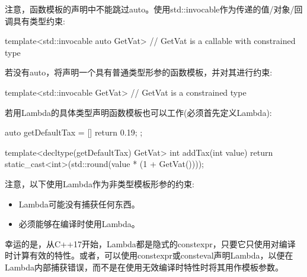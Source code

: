注意，函数模板的声明中不能跳过auto。使用std::invocable作为传递的值/对象/回调具有类型约束:

\begin{cpp}
template<std::invocable auto GetVat> // GetVat is a callable with constrained type
\end{cpp}

若没有auto，将声明一个具有普通类型形参的函数模板，并对其进行约束:

\begin{cpp}
template<std::invocable GetVat> // GetVat is a constrained type
\end{cpp}

若用Lambda的具体类型声明函数模板也可以工作(必须首先定义Lambda):

\begin{cpp}
auto getDefaultTax = [] {
	return 0.19;
};

template<decltype(getDefaultTax) GetVat>
int addTax(int value)
{
	return static_cast<int>(std::round(value * (1 + GetVat())));
}
\end{cpp}

注意，以下使用Lambda作为非类型模板形参的约束:

\begin{itemize}
\item 
Lambda可能没有捕获任何东西。

\item
必须能够在编译时使用Lambda。
\end{itemize}

幸运的是，从C++17开始，Lambda都是隐式的constexpr，只要它只使用对编译时计算有效的特性。或者，可以使用constexpr或consteval声明Lambda，以便在Lambda内部捕获错误，而不是在使用无效编译时特性时将其用作模板参数。









